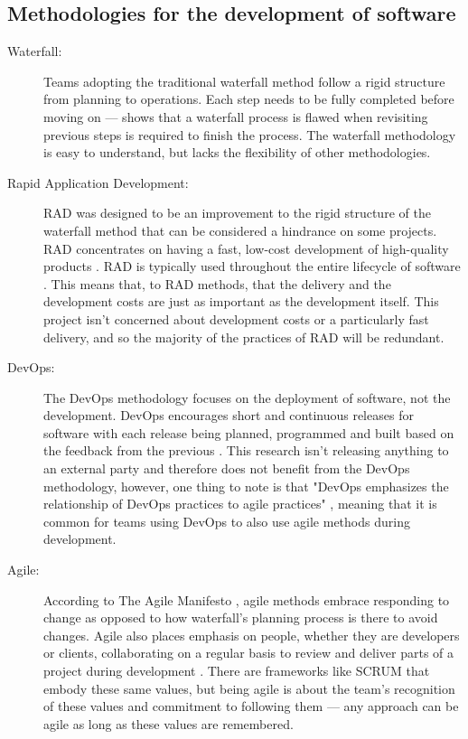 \documentclass[11pt, a4paper]{report}
\begin{document}
\cleardoublepage
\begin{appendices}

\chapter{Methodologies for the development of software}
\label{appendix:softwareDevelopmentMethodologies}

\begin{description}

  \item[Waterfall:] Teams adopting the traditional waterfall method follow a rigid structure from planning to operations. Each step needs to be fully completed before moving on --- \citeauthor{royce1987managing} \parencite*[330]{royce1987managing} shows that a waterfall process is flawed when revisiting previous steps is required to finish the process. The waterfall methodology is easy to understand, but lacks the flexibility of other methodologies.
   
  \item[Rapid Application Development:] RAD was designed to be an improvement to the rigid structure of the waterfall method that can be considered a hindrance on some projects. RAD concentrates on having a fast, low-cost development of high-quality products \parencite{martin1991rapid}. RAD is typically used throughout the entire lifecycle of software \parencite[211]{beynon1999rapid}. This means that, to RAD methods, that the delivery and the development costs are just as important as the development itself. This project isn't concerned about development costs or a particularly fast delivery, and so the majority of the practices of RAD will be redundant.
   
  \item[DevOps:] The DevOps methodology focuses on the deployment of software, not the development. DevOps encourages short and continuous releases for software with each release being planned, programmed and built based on the feedback from the previous \parencite{bass2015devops}. This research isn't releasing anything to an external party and therefore does not benefit from the DevOps methodology, however, one thing to note is that "DevOps emphasizes the relationship of DevOps practices to agile practices" \parencite[15]{bass2015devops}, meaning that it is common for teams using DevOps to also use agile methods during development.

  \item[Agile:] According to The Agile Manifesto \parencite[2]{fowler2001agile}, agile methods embrace responding to change as opposed to how waterfall's planning process is there to avoid changes. Agile also places emphasis on people, whether they are developers or clients, collaborating on a regular basis to review and deliver parts of a project during development \parencite[3]{fowler2001agile}. There are frameworks like SCRUM \parencite[1]{fowler2001agile} that embody these same values, but being agile is about the team's recognition of these values and commitment to following them --- any approach can be agile as long as these values are remembered.


\end{description}
\end{appendices}
\end{document}
